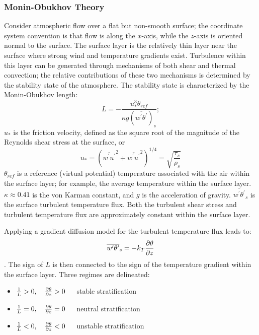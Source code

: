 \subsubsection{Monin-Obukhov Theory}
Consider atmospheric flow over a flat but non-smooth surface; the
coordinate system convention is that flow is along the $x$-axis, while
the $z$-axis is oriented normal to the surface.  The surface layer is
the relatively thin layer near the surface where strong wind and
temperature gradients exist.  Turbulence within this layer can be
generated through mechanisms of both shear and thermal convection; the
relative contributions of these two mechanisms is determined by the
stability state of the atmosphere.  The stability state is
characterized by the Monin-Obukhov length:
\begin{equation}
 L = - \frac{u_*^3 \theta_{ref}}{\kappa g (\overline{w^\prime
     \theta^\prime})_s};
\end{equation}
$u_*$ is the friction velocity, defined as the
square root of the magnitude of the Reynolds shear stress at
the surface, or
\begin{equation}
 u_* = \left( \overline{w^\prime u^\prime}^2 + \overline{w^\prime
   u^\prime}^2 \right)^{1/4} = \sqrt{\frac{\tau_s}{\rho_s}}
\end{equation}
$\theta_{ref}$ is a reference (virtual potential) temperature associated with the air
within the surface layer; for example, the average temperature within
the surface layer.  $\kappa \approx 0.41$ is the von Karman constant,
and $g$ is the acceleration of gravity.  $\overline{w^\prime
     \theta^\prime}_s$ is the surface turbulent temperature flux.  Both the
turbulent shear stress and turbulent temperature flux are approximately
constant within the surface layer.

Applying a gradient diffusion model for the turbulent temperature flux leads to:
\begin{equation}
 \overline{w^\prime \theta^\prime}_s = -k_T \frac{\partial{\theta}}{\partial{z}}
\end{equation}.
The sign of $L$ is then connected to the sign of the temperature
gradient within the surface layer.  Three regimes are delineated:
\begin{itemize}
  \item $\frac{1}{L} > 0, \quad \frac{\partial{\theta}}{\partial{z}} > 0$~~~stable
    stratification
  \item $\frac{1}{L} = 0, \quad \frac{\partial{\theta}}{\partial{z}} = 0$~~~neutral
    stratification
  \item $\frac{1}{L} < 0, \quad \frac{\partial{\theta}}{\partial{z}} < 0$~~~unstable stratification
\end{itemize}


